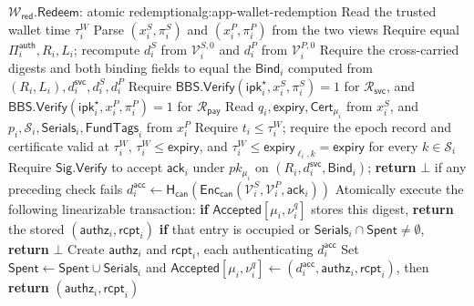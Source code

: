\documentclass[letterpaper]{article}
\newcommand{\hash}{\mathsf{H}_{\mathsf{can}}}
\begin{document}
\begin{MMAppendixAlgorithm}{\(\mathcal W_{\mathsf{red}}.\mathsf{Redeem}\): atomic redemption}{alg:app-wallet-redemption}
\State Read the trusted wallet time \(\tau_i^W\)
\State Parse \((x_i^S,\pi_i^S)\) and \((x_i^P,\pi_i^P)\) from the two views
\State Require equal \(\Pi_i^{\mathsf{auth}},R_i,L_i\); recompute
  \(d_i^S\) from \(\mathcal V_i^{S,0}\) and \(d_i^P\) from
  \(\mathcal V_i^{P,0}\)
\State Require the cross-carried digests and both binding fields to equal the
  \(\mathsf{Bind}_i\) computed from \((R_i,L_i),
  d_i^{\mathsf{svc}},d_i^S,d_i^P\)
\State Require
  \(\mathsf{BBS.Verify}(\mathsf{ipk}_i^\star,x_i^S,\pi_i^S)=1\) for
  \(\mathcal R_{\mathsf{svc}}\), and
  \(\mathsf{BBS.Verify}(\mathsf{ipk}_i^\star,x_i^P,\pi_i^P)=1\) for
  \(\mathcal R_{\mathsf{pay}}\)
\State Read \(q_i,\mathsf{expiry},\mathsf{Cert}_{\mu_i}\) from \(x_i^S\), and
  \(p_i,\mathcal S_i,\mathsf{Serials}_i,\mathsf{FundTags}_i\) from \(x_i^P\)
\State Require \(t_i\le\tau_i^W\); require the epoch record and certificate
  valid at \(\tau_i^W\), \(\tau_i^W\le\mathsf{expiry}\), and
  \(\tau_i^W\le\mathsf{expiry}_{\ell_i,k}=\mathsf{expiry}\) for every
  \(k\in\mathcal S_i\)
\State Require \(\mathsf{Sig.Verify}\) to accept \(\mathsf{ack}_i\) under
  \(pk_{\mu_i}\) on \((R_i,d_i^{\mathsf{svc}},\mathsf{Bind}_i)\);
  \textbf{return} \(\bot\) if any preceding check fails
\State \(d_i^{\mathsf{acc}}\leftarrow
  \hash(\mathsf{Enc}_{\mathsf{can}}(
    \mathcal V_i^S,\mathcal V_i^P,\mathsf{ack}_i))\)
\State Atomically execute the following linearizable transaction:
\Statex \hspace{\algorithmicindent}\textbf{if}
  \(\mathsf{Accepted}[\mu_i,\nu_i^q]\) stores this digest,
  \textbf{return} the stored \((\mathsf{authz}_i,\mathsf{rcpt}_i)\)
\Statex \hspace{\algorithmicindent}\textbf{if} that entry is occupied or
  \(\mathsf{Serials}_i\cap\mathsf{Spent}\ne\emptyset\),
  \textbf{return} \(\bot\)
\Statex \hspace{\algorithmicindent}Create \(\mathsf{authz}_i\) and
  \(\mathsf{rcpt}_i\), each authenticating \(d_i^{\mathsf{acc}}\)
\Statex \hspace{\algorithmicindent}Set
  \(\mathsf{Spent}\leftarrow\mathsf{Spent}\cup\mathsf{Serials}_i\) and
  \(\mathsf{Accepted}[\mu_i,\nu_i^q]\leftarrow
  (d_i^{\mathsf{acc}},\mathsf{authz}_i,\mathsf{rcpt}_i)\), then
  \textbf{return} \((\mathsf{authz}_i,\mathsf{rcpt}_i)\)
\end{MMAppendixAlgorithm}
\end{document}
